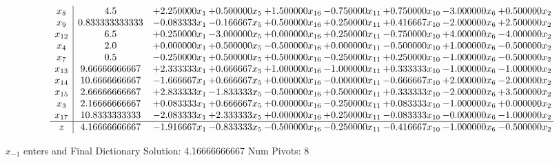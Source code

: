 \documentclass[10pt]{article}
\begin{document}
 \[\begin{array}{c| c c@{\hskip 2pt} c@{\hskip 2pt} c@{\hskip 2pt} c@{\hskip 2pt} c@{\hskip 2pt} c@{\hskip 2pt} c@{\hskip 2pt} }
 x_{8}   &  4.5 & + 2.250000 x_{1} & + 0.500000 x_{5} & + 1.500000 x_{16} & -0.750000 x_{11} & + 0.750000 x_{10} & -3.000000 x_{6} & + 0.500000 x_{2}\\
 x_{9}   &  0.833333333333 & -0.083333 x_{1} & -0.166667 x_{5} & + 0.500000 x_{16} & + 0.250000 x_{11} & + 0.416667 x_{10} & -2.000000 x_{6} & + 2.500000 x_{2}\\
 x_{12}   &  6.5 & + 0.250000 x_{1} & -3.000000 x_{5} & + 0.000000 x_{16} & + 0.250000 x_{11} & -0.750000 x_{10} & + 4.000000 x_{6} & -4.000000 x_{2}\\
 x_{4}   &  2.0 & + 0.000000 x_{1} & + 0.500000 x_{5} & -0.500000 x_{16} & + 0.000000 x_{11} & -0.500000 x_{10} & + 1.000000 x_{6} & -0.500000 x_{2}\\
 x_{7}   &  0.5 & -0.250000 x_{1} & + 0.500000 x_{5} & + 0.500000 x_{16} & -0.250000 x_{11} & + 0.250000 x_{10} & -1.000000 x_{6} & -0.500000 x_{2}\\
 x_{13}   &  9.66666666667 & + 2.333333 x_{1} & + 0.666667 x_{5} & + 1.000000 x_{16} & -1.000000 x_{11} & + 0.333333 x_{10} & -1.000000 x_{6} & -1.000000 x_{2}\\
 x_{14}   &  10.6666666667 & -1.666667 x_{1} & + 0.666667 x_{5} & + 0.000000 x_{16} & -0.000000 x_{11} & -0.666667 x_{10} & + 2.000000 x_{6} & -2.000000 x_{2}\\
 x_{15}   &  2.66666666667 & + 2.833333 x_{1} & -1.833333 x_{5} & -0.500000 x_{16} & + 0.500000 x_{11} & + 0.333333 x_{10} & -2.000000 x_{6} & + 3.500000 x_{2}\\
 x_{3}   &  2.16666666667 & + 0.083333 x_{1} & + 0.666667 x_{5} & + 0.000000 x_{16} & -0.250000 x_{11} & + 0.083333 x_{10} & -1.000000 x_{6} & + 0.000000 x_{2}\\
 x_{17}   &  10.8333333333 & -2.083333 x_{1} & + 2.333333 x_{5} & + 0.000000 x_{16} & + 0.250000 x_{11} & -0.083333 x_{10} & -0.000000 x_{6} & -1.000000 x_{2}\\
\hline
z    &  4.16666666667 & -1.916667 x_{1} & -0.833333 x_{5} & -0.500000 x_{16} & -0.250000 x_{11} & -0.416667 x_{10} & -1.000000 x_{6} & -0.500000 x_{2}\\
\end{array}\]


 $ x_{-1} $ enters and Final Dictionary
Solution:  4.16666666667
Num Pivots:  8
\end{document}

